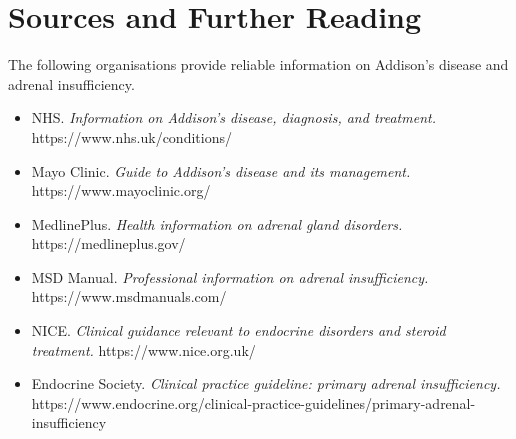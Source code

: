 \section*{Sources and Further Reading}
The following organisations provide reliable information on Addison's disease and adrenal insufficiency.

\begin{itemize}
    \item NHS. \textit{Information on Addison's disease, diagnosis, and treatment.} https://www.nhs.uk/conditions/
    \item Mayo Clinic. \textit{Guide to Addison's disease and its management.} https://www.mayoclinic.org/
    \item MedlinePlus. \textit{Health information on adrenal gland disorders.} https://medlineplus.gov/
    \item MSD Manual. \textit{Professional information on adrenal insufficiency.} https://www.msdmanuals.com/
    \item NICE. \textit{Clinical guidance relevant to endocrine disorders and steroid treatment.} https://www.nice.org.uk/
    \item Endocrine Society. \textit{Clinical practice guideline: primary adrenal insufficiency.} https://www.endocrine.org/clinical-practice-guidelines/primary-adrenal-insufficiency
\end{itemize}

